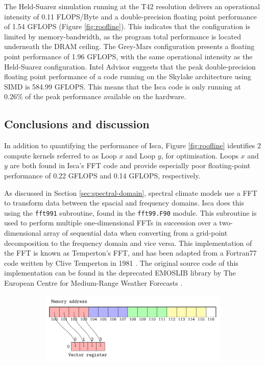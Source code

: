 \documentclass[a4paper,11pt]{report}
\begin{document}
The Held-Suarez simulation running at the T42 resolution delivers an operational intensity of 0.11 FLOPS/Byte and a double-precision floating point performance of 1.54 GFLOPS (Figure \ref{fig:roofline}). This indicates that the configuration is limited by memory-bandwidth, as the program total performance is located underneath the DRAM ceiling. The Grey-Mars configuration presents a floating point performance of 1.96 GFLOPS, with the same operational intensity as the Held-Suarez configuration. Intel Advisor suggests that the peak double-precision floating point performance of a code running on the Skylake architecture using SIMD is 584.99 GFLOPS. This means that the Isca code is only running at 0.26\% of the peak performance available on the hardware.

\subsection{Conclusions and discussion}
In addition to quantifying the performance of Isca, Figure \ref{fig:roofline} identifies 2 compute kernels referred to as Loop $x$ and Loop $y$, for optimisation. Loops $x$ and $y$ are both found in Isca's FFT code and provide especially poor floating-point performance of 0.22 GFLOPS and 0.14 GFLOPS, respectively. 
\par
As discussed in Section \ref{sec:spectral-domain}, spectral climate models use a FFT to transform data between the spacial and frequency domains. Isca does this using the \texttt{fft991} subroutine, found in the \texttt{fft99.F90} module. This subroutine is used to perform multiple one-dimensional FFTs in succession over a two-dimensional array of sequential data when converting from a grid-point decomposition to the frequency domain and vice versa. This implementation of the FFT is known as Temperton's FFT, and has been adapted from a Fortran77 code written by Clive Temperton in 1981 \cite{temperton1980fft}. The original source code of this implementation can be found in the deprecated EMOSLIB library by The European Centre for Medium-Range Weather Forecasts \cite{ecmwf2015emoslib}.
\par
\begin{figure}[htbp]
\centering
\begin{subfigure}[b]{1\textwidth}
\centering
   \includegraphics[width=0.9\linewidth]{img/tikz-img/vector_registers_contiguous/vector_registers.pdf}
   \caption{}
   \label{fig:Ng1} 
\end{subfigure}
\end{figure}
\end{document}
